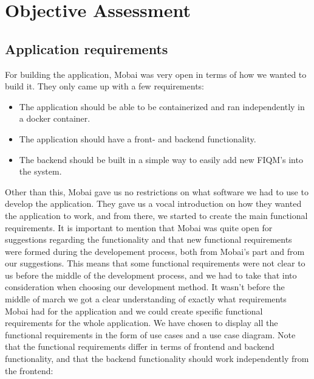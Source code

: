 \chapter{Objective Assessment}
\label{chap:objective}

\section{Application requirements}
For building the application, Mobai was very open in terms of how we wanted to build it. They only came up with a few requirements:
\begin{itemize}
    \item The application should be able to be containerized and ran independently in a docker container.
    \item The application should have a front- and backend functionality.
    \item The backend should be built in a simple way to easily add new FIQM's into the system.
\end{itemize}
Other than this, Mobai gave us no restrictions on what software we had to use to develop the application. They gave us a vocal introduction on how they wanted the application to work, and from there, we started to create the main functional requirements. It is important to mention that Mobai was quite open for suggestions regarding the functionality and that new functional requirements were formed during the developement process, both from Mobai's part and from our suggestions. This means that some functional requirements were not clear to us before the middle of the development process, and we had to take that into consideration when choosing our development method. It wasn't before the middle of march we got a clear understanding of exactly what requirements Mobai had for the application and we could create specific functional requirements for the whole application. We have chosen to display all the functional requirements in the form of use cases and a use case diagram. Note that the functional requirements differ in terms of frontend and backend functionality, and that the backend functionality should work independently from the frontend:         


